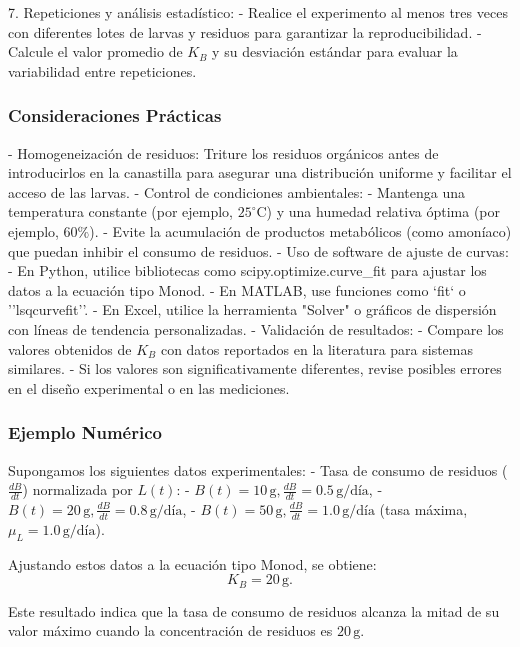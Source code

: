 \documentclass[12pt]{article}
\begin{document}
7. Repeticiones y análisis estadístico:
   - Realice el experimento al menos tres veces con diferentes lotes de larvas y residuos para garantizar la reproducibilidad.
   - Calcule el valor promedio de $K_B$ y su desviación estándar para evaluar la variabilidad entre repeticiones.

\subsubsection{Consideraciones Prácticas}

- Homogeneización de residuos: Triture los residuos orgánicos antes de introducirlos en la canastilla para asegurar una distribución uniforme y facilitar el acceso de las larvas.
- Control de condiciones ambientales:
  - Mantenga una temperatura constante (por ejemplo, $25^\circ \text{C}$) y una humedad relativa óptima (por ejemplo, $60\%$).
  - Evite la acumulación de productos metabólicos (como amoníaco) que puedan inhibir el consumo de residuos.
- Uso de software de ajuste de curvas:
  - En Python, utilice bibliotecas como scipy.optimize.curve\_fit para ajustar los datos a la ecuación tipo Monod.
  - En MATLAB, use funciones como `fit` o ''lsqcurvefit''.
  - En Excel, utilice la herramienta "Solver" o gráficos de dispersión con líneas de tendencia personalizadas.
- Validación de resultados:
  - Compare los valores obtenidos de $K_B$ con datos reportados en la literatura para sistemas similares.
  - Si los valores son significativamente diferentes, revise posibles errores en el diseño experimental o en las mediciones.

\subsubsection{Ejemplo Numérico}

Supongamos los siguientes datos experimentales:
- Tasa de consumo de residuos ($\frac{dB}{dt}$) normalizada por $L(t)$:
  - $B(t) = 10 \, \text{g}, \frac{dB}{dt} = 0.5 \, \text{g/día}$,
  - $B(t) = 20 \, \text{g}, \frac{dB}{dt} = 0.8 \, \text{g/día}$,
  - $B(t) = 50 \, \text{g}, \frac{dB}{dt} = 1.0 \, \text{g/día}$ (tasa máxima, $\mu_L = 1.0 \, \text{g/día}$).

Ajustando estos datos a la ecuación tipo Monod, se obtiene:
\[
K_B = 20 \, \text{g}.
\]

Este resultado indica que la tasa de consumo de residuos alcanza la mitad de su valor máximo cuando la concentración de residuos es $20 \, \text{g}$.
\end{document}
